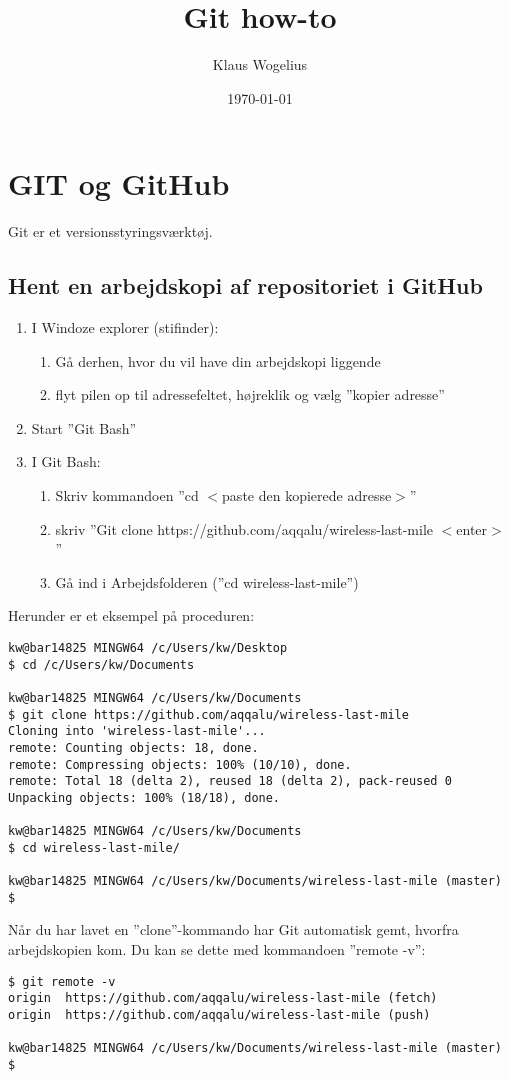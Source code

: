 \documentclass[11pt,a4paper,twoside]{report}
\title{Git how-to}
\author{Klaus Wogelius}
\date{\today}
\begin{document}
\maketitle
\tableofcontents

\chapter{GIT og GitHub}
Git er et versionsstyringsværktøj.
\section{Hent en arbejdskopi af repositoriet i GitHub}
\begin{enumerate}

 \item I Windoze explorer (stifinder):
 \begin{enumerate}
  \item Gå derhen, hvor du vil have din arbejdskopi liggende
  \item flyt pilen op til adressefeltet, højreklik og vælg ''kopier adresse''
 \end{enumerate}
 \item Start ''Git Bash''
 \item I Git Bash:
 \begin{enumerate}
  \item Skriv kommandoen ''cd $<$paste den kopierede adresse$>$''
  \item skriv ''Git clone https://github.com/aqqalu/wireless-last-mile $<$enter$>$''
  \item Gå ind i Arbejdsfolderen (''cd wireless-last-mile'')
 \end{enumerate}
\end{enumerate}
Herunder er et eksempel på proceduren:
\begin{verbatim}
kw@bar14825 MINGW64 /c/Users/kw/Desktop
$ cd /c/Users/kw/Documents

kw@bar14825 MINGW64 /c/Users/kw/Documents
$ git clone https://github.com/aqqalu/wireless-last-mile
Cloning into 'wireless-last-mile'...
remote: Counting objects: 18, done.
remote: Compressing objects: 100% (10/10), done.
remote: Total 18 (delta 2), reused 18 (delta 2), pack-reused 0
Unpacking objects: 100% (18/18), done.

kw@bar14825 MINGW64 /c/Users/kw/Documents
$ cd wireless-last-mile/

kw@bar14825 MINGW64 /c/Users/kw/Documents/wireless-last-mile (master)
$
\end{verbatim}
\par
Når  du har lavet en ''clone''-kommando har Git automatisk gemt, hvorfra arbejdskopien kom. Du kan se dette med kommandoen ''remote -v'':
\begin{verbatim}
$ git remote -v
origin  https://github.com/aqqalu/wireless-last-mile (fetch)
origin  https://github.com/aqqalu/wireless-last-mile (push)

kw@bar14825 MINGW64 /c/Users/kw/Documents/wireless-last-mile (master)
$ 
\end{verbatim}
\end{document}
